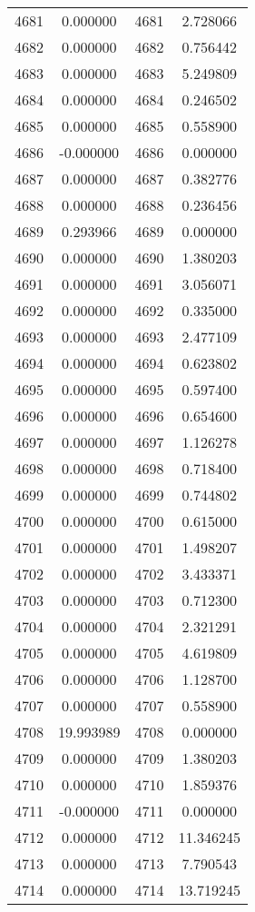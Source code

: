 \documentclass[12pt]{article}
\begin{document}
\begin{longtable}{@{}cccc@{}}
4681 & 0.000000 & 4681 & 2.728066 \\
4682 & 0.000000 & 4682 & 0.756442 \\
4683 & 0.000000 & 4683 & 5.249809 \\
4684 & 0.000000 & 4684 & 0.246502 \\
4685 & 0.000000 & 4685 & 0.558900 \\
4686 & -0.000000 & 4686 & 0.000000 \\
4687 & 0.000000 & 4687 & 0.382776 \\
4688 & 0.000000 & 4688 & 0.236456 \\
4689 & 0.293966 & 4689 & 0.000000 \\
4690 & 0.000000 & 4690 & 1.380203 \\
4691 & 0.000000 & 4691 & 3.056071 \\
4692 & 0.000000 & 4692 & 0.335000 \\
4693 & 0.000000 & 4693 & 2.477109 \\
4694 & 0.000000 & 4694 & 0.623802 \\
4695 & 0.000000 & 4695 & 0.597400 \\
4696 & 0.000000 & 4696 & 0.654600 \\
4697 & 0.000000 & 4697 & 1.126278 \\
4698 & 0.000000 & 4698 & 0.718400 \\
4699 & 0.000000 & 4699 & 0.744802 \\
4700 & 0.000000 & 4700 & 0.615000 \\
4701 & 0.000000 & 4701 & 1.498207 \\
4702 & 0.000000 & 4702 & 3.433371 \\
4703 & 0.000000 & 4703 & 0.712300 \\
4704 & 0.000000 & 4704 & 2.321291 \\
4705 & 0.000000 & 4705 & 4.619809 \\
4706 & 0.000000 & 4706 & 1.128700 \\
4707 & 0.000000 & 4707 & 0.558900 \\
4708 & 19.993989 & 4708 & 0.000000 \\
4709 & 0.000000 & 4709 & 1.380203 \\
4710 & 0.000000 & 4710 & 1.859376 \\
4711 & -0.000000 & 4711 & 0.000000 \\
4712 & 0.000000 & 4712 & 11.346245 \\
4713 & 0.000000 & 4713 & 7.790543 \\
4714 & 0.000000 & 4714 & 13.719245 \\

\end{longtable}
\end{document}
